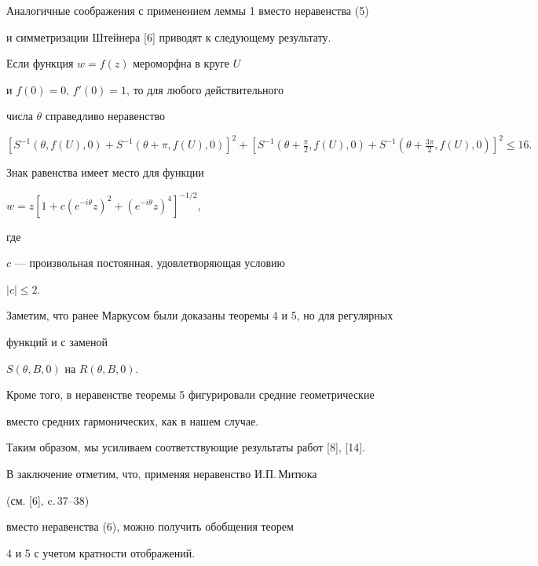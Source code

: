Аналогичные соображения с применением леммы 1 вместо неравенства (5)


и симметризации Штейнера [6] приводят к следующему результату.





\begin{thm} Если функция $w=f(z)$ мероморфна в круге $U$ 


и $f(0)=0$, $f'(0)=1$, то для любого действительного


числа $\theta $ справедливо неравенство


$$


[S^{-1}(\theta,f(U),0)+S^{-1}(\theta+\pi,f(U),0)]^2+


[S^{-1}(\theta+\tfrac{\pi}{2},f(U),0)+S^{-1}(\theta+


\tfrac{3\pi}{2},f(U),0)]^2\leq 16.


$$


Знак равенства имеет место для функции


$w=z[1+c(e^{-i\theta}z)^2+(e^{-i\theta}z)^4]^{-1/2}$,


где


$c$ --- произвольная постоянная, удовлетворяющая условию


$|c|\leq 2$.


\end{thm}





Заметим, что ранее Маркусом были доказаны теоремы 4 и 5, но для регулярных 


функций и с заменой 


$S(\theta,B,0)$ на $R(\theta,B,0)$.


Кроме того, в неравенстве теоремы 5 фигурировали средние геометрические 


вместо средних гармонических, как в нашем случае. 


Таким образом, мы усиливаем соответствующие результаты работ [8], [14].


В заключение отметим, что, применяя неравенство И.П.\,Митюка


(см. [6], c.\,37--38)


вместо неравенства (6), можно получить обобщения теорем


4 и 5 с учетом кратности отображений. 





